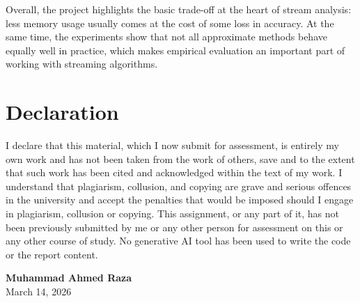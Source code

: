 \documentclass[11pt,a4paper]{article}
\begin{document}
Overall, the project highlights the basic trade-off at the heart of stream analysis: less memory usage usually comes at the cost of some loss in accuracy. At the same time, the experiments show that not all approximate methods behave equally well in practice, which makes empirical evaluation an important part of working with streaming algorithms.

\section*{Declaration}

I declare that this material, which I now submit for assessment, is entirely my own work and has not been taken from the work of others, save and to the extent that such work has been cited and acknowledged within the text of my work. I understand that plagiarism, collusion, and copying are grave and serious offences in the university and accept the penalties that would be imposed should I engage in plagiarism, collusion or copying. This assignment, or any part of it, has not been previously submitted by me or any other person for assessment on this or any other course of study. No generative AI tool has been used to write the code or the report content.

\vspace{0.5cm}

\noindent
\textbf{Muhammad Ahmed Raza} \\
March 14, 2026
\end{document}
